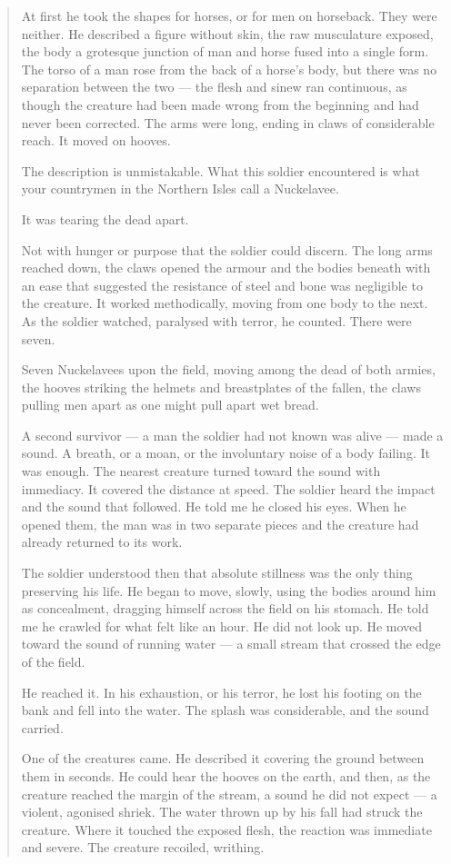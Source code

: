 \begin{quote}
At first he took the shapes for horses, or for men on horseback. They were neither. He described a figure without skin, the raw musculature exposed, the body a grotesque junction of man and horse fused into a single form. The torso of a man rose from the back of a horse's body, but there was no separation between the two --- the flesh and sinew ran continuous, as though the creature had been made wrong from the beginning and had never been corrected. The arms were long, ending in claws of considerable reach. It moved on hooves.

The description is unmistakable. What this soldier encountered is what your countrymen in the Northern Isles call a Nuckelavee.

It was tearing the dead apart.

Not with hunger or purpose that the soldier could discern. The long arms reached down, the claws opened the armour and the bodies beneath with an ease that suggested the resistance of steel and bone was negligible to the creature. It worked methodically, moving from one body to the next. As the soldier watched, paralysed with terror, he counted. There were seven.

Seven Nuckelavees upon the field, moving among the dead of both armies, the hooves striking the helmets and breastplates of the fallen, the claws pulling men apart as one might pull apart wet bread.

A second survivor --- a man the soldier had not known was alive --- made a sound. A breath, or a moan, or the involuntary noise of a body failing. It was enough. The nearest creature turned toward the sound with immediacy. It covered the distance at speed. The soldier heard the impact and the sound that followed. He told me he closed his eyes. When he opened them, the man was in two separate pieces and the creature had already returned to its work.

The soldier understood then that absolute stillness was the only thing preserving his life. He began to move, slowly, using the bodies around him as concealment, dragging himself across the field on his stomach. He told me he crawled for what felt like an hour. He did not look up. He moved toward the sound of running water --- a small stream that crossed the edge of the field.

He reached it. In his exhaustion, or his terror, he lost his footing on the bank and fell into the water. The splash was considerable, and the sound carried.

One of the creatures came. He described it covering the ground between them in seconds. He could hear the hooves on the earth, and then, as the creature reached the margin of the stream, a sound he did not expect --- a violent, agonised shriek. The water thrown up by his fall had struck the creature. Where it touched the exposed flesh, the reaction was immediate and severe. The creature recoiled, writhing.


\end{quote}
